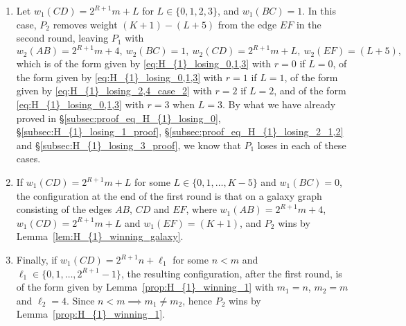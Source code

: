 \documentclass[11pt,reqno]{amsart}
\theoremstyle{definition}
\theoremstyle{definition}
\begin{document}
\begin{enumerate}
\begin{enumerate}
\item Let $w_{1}(CD)=2^{R+1}m+L$ for $L \in \{0,1,2,3\}$, and $w_{1}(BC)=1$. In this case, $P_{2}$ removes weight $(K+1)-(L+5)$ from the edge $EF$ in the second round, leaving $P_{1}$ with
\begin{equation}
w_{2}(AB)=2^{R+1}m+4,\ w_{2}(BC)=1,\ w_{2}(CD)=2^{R+1}m+L,\ w_{2}(EF)=(L+5),\nonumber
\end{equation}
which is of the form given by \eqref{eq:H_{1}_losing_0,1,3} with $r=0$ if $L=0$, of the form given by \eqref{eq:H_{1}_losing_0,1,3} with $r=1$ if $L=1$, of the form given by \eqref{eq:H_{1}_losing_2,4_case_2} with $r=2$ if $L=2$, and of the form \eqref{eq:H_{1}_losing_0,1,3} with $r=3$ when $L=3$. By what we have already proved in \S\ref{subsec:proof_eq_H_{1}_losing_0}, \S\ref{subsec:H_{1}_losing_1_proof}, \S\ref{subsec:proof_eq_H_{1}_losing_2_1,2} and \S\ref{subsec:H_{1}_losing_3_proof}, we know that $P_{1}$ loses in each of these cases. 

\item If $w_{1}(CD)=2^{R+1}m+L$ for some $L \in \{0,1,\ldots,K-5\}$ and $w_{1}(BC)=0$, the configuration at the end of the first round is that on a galaxy graph consisting of the edges $AB$, $CD$ and $EF$, where $w_{1}(AB)=2^{R+1}m+4$, $w_{1}(CD)=2^{R+1}m+L$ and $w_{1}(EF)=(K+1)$, and $P_{2}$ wins by Lemma~\ref{lem:H_{1}_winning_galaxy}.

\item Finally, if $w_{1}(CD)=2^{R+1}n+\ell_{1}$ for some $n < m$ and $\ell_{1} \in \{0,1,\ldots,2^{R+1}-1\}$, the resulting configuration, after the first round, is of the form given by Lemma~\ref{prop:H_{1}_winning_1} with $m_{1}=n$, $m_{2}=m$ and $\ell_{2}=4$. Since $n<m \implies m_{1}\neq m_{2}$, hence $P_{2}$ wins by Lemma~\ref{prop:H_{1}_winning_1}.
\end{enumerate}


\end{enumerate}
\end{document}
